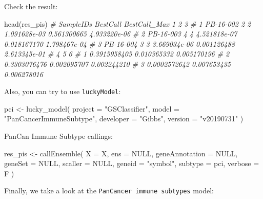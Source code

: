 \documentclass[
  12pt,
]{book}
\newenvironment{Shaded}{\begin{snugshade}}{\end{snugshade}}
\newcommand{\AttributeTok}[1]{\textcolor[rgb]{0.77,0.63,0.00}{#1}}
\newcommand{\CommentTok}[1]{\textcolor[rgb]{0.56,0.35,0.01}{\textit{#1}}}
\newcommand{\ConstantTok}[1]{\textcolor[rgb]{0.00,0.00,0.00}{#1}}
\newcommand{\FunctionTok}[1]{\textcolor[rgb]{0.00,0.00,0.00}{#1}}
\newcommand{\NormalTok}[1]{#1}
\newcommand{\OtherTok}[1]{\textcolor[rgb]{0.56,0.35,0.01}{#1}}
\newcommand{\StringTok}[1]{\textcolor[rgb]{0.31,0.60,0.02}{#1}}
\begin{document}
Check the result:

\begin{Shaded}
\begin{Highlighting}[]
\FunctionTok{head}\NormalTok{(res\_pis)}
\CommentTok{\#   SampleIDs BestCall BestCall\_Max            1           2            3}
\CommentTok{\# 1 PB{-}16{-}002        2            2 1.091628e{-}03 0.561300665 4.933220e{-}06}
\CommentTok{\# 2 PB{-}16{-}003        4            4 4.521818e{-}07 0.018167170 1.798467e{-}04}
\CommentTok{\# 3 PB{-}16{-}004        3            3 3.669034e{-}06 0.001126488 2.613345e{-}01}
\CommentTok{\#              4           5           6}
\CommentTok{\# 1 0.3915958405 0.010365332 0.005170196}
\CommentTok{\# 2 0.3303076476 0.002095707 0.002244210}
\CommentTok{\# 3 0.0002572642 0.007653435 0.006278016}
\end{Highlighting}
\end{Shaded}

Also, you can try to use \texttt{luckyModel}:

\begin{Shaded}
\begin{Highlighting}[]
\NormalTok{pci }\OtherTok{\textless{}{-}} \FunctionTok{lucky\_model}\NormalTok{(}
  \AttributeTok{project =} \StringTok{"GSClassifier"}\NormalTok{,}
  \AttributeTok{model =} \StringTok{"PanCancerImmuneSubtype"}\NormalTok{,}
  \AttributeTok{developer =} \StringTok{"Gibbs"}\NormalTok{,}
  \AttributeTok{version =} \StringTok{"v20190731"}
\NormalTok{)}
\end{Highlighting}
\end{Shaded}

PanCan Immune Subtype callings:

\begin{Shaded}
\begin{Highlighting}[]
\NormalTok{res\_pis }\OtherTok{\textless{}{-}} \FunctionTok{callEnsemble}\NormalTok{(}
    \AttributeTok{X =}\NormalTok{ X,}
    \AttributeTok{ens =} \ConstantTok{NULL}\NormalTok{,}
    \AttributeTok{geneAnnotation =} \ConstantTok{NULL}\NormalTok{,}
    \AttributeTok{geneSet =} \ConstantTok{NULL}\NormalTok{,}
    \AttributeTok{scaller =} \ConstantTok{NULL}\NormalTok{,}
    \AttributeTok{geneid =} \StringTok{"symbol"}\NormalTok{,}
    \AttributeTok{subtype =}\NormalTok{ pci,}
    \AttributeTok{verbose =}\NormalTok{ F}
\NormalTok{  )}
\end{Highlighting}
\end{Shaded}

Finally, we take a look at the \texttt{PanCancer\ immune\ subtypes} model:
\end{document}
